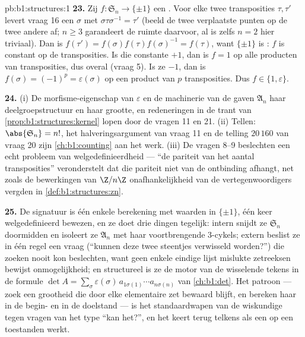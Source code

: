 \begin{solution}{pb:b1:structures:1}
\textbf{23.} Zij $f \colon \mathfrak S_n \to \{\pm1\}$ een . Voor
elke twee transposities $\tau, \tau'$ levert vraag 16 een $\sigma$ met
$\sigma\tau\sigma^{-1} = \tau'$ (beeld de twee verplaatste punten op de
twee andere af; $n \geq 3$ garandeert de ruimte daarvoor, al is zelfs $n =
2$ hier triviaal). Dan is $f(\tau') = f(\sigma)f(\tau)f(\sigma)^{-1} =
f(\tau)$, want $\{\pm1\}$ is : $f$ is constant op de transposities.
Is die constante $+1$, dan is $f = 1$ op alle producten van transposities,
dus overal (vraag 5). Is ze $-1$, dan is $f(\sigma) = (-1)^p =
\varepsilon(\sigma)$ op een product van $p$ transposities. Dus $f \in \{1,
\varepsilon\}$.

\textbf{24.} (i) De morfisme-eigenschap van $\varepsilon$ en de machinerie
van de  gaven $\mathfrak A_n$ haar deelgroepstructuur en haar grootte,
en redeneringen in de trant van \cref{prop:b1:structures:kernel} lopen door
de vragen 11 en 21. (ii) Tellen: $\abs{\mathfrak S_n} = n!$, het
halveringsargument van vraag 11 en de telling $20\,160$ van vraag 20 zijn
\cref{ch:b1:counting} aan het werk. (iii) De vragen 8--9 beslechten een
echt probleem van welgedefinieerdheid --- ``de pariteit van het aantal
transposities'' veronderstelt dat die pariteit niet van de ontbinding
afhangt, net zoals de bewerkingen van $\Z/n\Z$ onafhankelijkheid van de
vertegenwoordigers vergden in \cref{def:b1:structures:zn}.

\textbf{25.} De signatuur is één enkele berekening met waarden in
$\{\pm1\}$, één keer welgedefinieerd bewezen, en ze doet drie dingen
tegelijk: intern snijdt ze $\mathfrak S_n$ doormidden en isoleert ze
$\mathfrak A_n$ met haar voortbrengende $3$-cykels; extern beslist ze in
één regel een vraag (``kunnen deze twee steentjes verwisseld worden?'')
die zoeken nooit kon beslechten, want geen enkele eindige lijst mislukte
zetreeksen bewijst onmogelijkheid; en structureel is ze de motor van de
wisselende tekens in de formule $\det A = \sum_\sigma
\varepsilon(\sigma)\, a_{1\sigma(1)}\cdots a_{n\sigma(n)}$ van
\cref{ch:b1:det}. Het patroon --- zoek een grootheid die door elke
elementaire zet bewaard blijft, en bereken haar in de begin- en in de
doelstand --- is het standaardwapen van de wiskundige tegen vragen van het
type ``kan het?'', en het keert terug telkens als een  op een
 toestanden werkt.
\end{solution}
